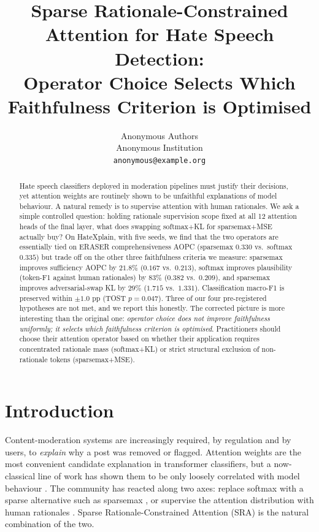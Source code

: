 \documentclass{article}
\title{Sparse Rationale-Constrained Attention for Hate Speech Detection:\\
Operator Choice Selects Which Faithfulness Criterion is Optimised}
\author{%
  Anonymous Authors\\
  Anonymous Institution\\
  \texttt{anonymous@example.org}
}
\begin{document}
\maketitle

\begin{abstract}
Hate speech classifiers deployed in moderation pipelines must justify their decisions, yet
attention weights are routinely shown to be unfaithful explanations of model behaviour.
A natural remedy is to supervise attention with human rationales. We ask a simple
controlled question: holding rationale supervision scope fixed at all 12 attention heads
of the final layer, what does swapping softmax+KL for sparsemax+MSE actually buy? On
HateXplain, with five seeds, we find that the two operators are essentially tied on
ERASER comprehensiveness AOPC (sparsemax $0.330$ vs.\ softmax $0.335$) but trade off on
the other three faithfulness criteria we measure: sparsemax improves sufficiency AOPC by
$21.8\%$ ($0.167$ vs.\ $0.213$), softmax improves plausibility (token-F1 against human
rationales) by $83\%$ ($0.382$ vs.\ $0.209$), and sparsemax improves adversarial-swap
KL by $29\%$ ($1.715$ vs.\ $1.331$). Classification macro-F1 is preserved within
$\pm 1.0$ pp (TOST $p{=}0.047$). Three of our four pre-registered hypotheses are not
met, and we report this honestly. The corrected picture is more interesting than the
original one: \emph{operator choice does not improve faithfulness uniformly; it selects
which faithfulness criterion is optimised}. Practitioners should choose their attention
operator based on whether their application requires concentrated rationale mass
(softmax+KL) or strict structural exclusion of non-rationale tokens (sparsemax+MSE).
\end{abstract}

\section{Introduction}
\label{sec:intro}

Content-moderation systems are increasingly required, by regulation and by users, to
\emph{explain} why a post was removed or flagged. Attention weights are the most
convenient candidate explanation in transformer classifiers, but a now-classical line of
work has shown them to be only loosely correlated with model behaviour
\citep{jain2019attention,wiegreffe2019attention}. The community has reacted along two
axes: replace softmax with a sparse alternative such as sparsemax
\citep{martins2016sparsemax,malaviya2018sparse,correia2019adaptively}, or supervise the
attention distribution with human rationales \citep{deyoung2020eraser}. Sparse
Rationale-Constrained Attention (SRA) \citep{eilertsen2025aligning} is the natural
combination of the two.
\end{document}
